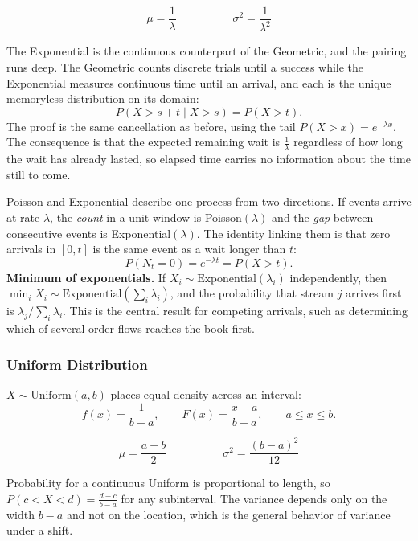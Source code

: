 \[
\mu = \frac{1}{\lambda} \hspace{5em} \sigma^2 = \frac{1}{\lambda^2}
\]

The Exponential is the continuous counterpart of the Geometric, and the pairing runs deep. The Geometric counts discrete trials until a success while the Exponential measures continuous time until an arrival, and each is the unique memoryless distribution on its domain:
\[
P(X > s + t \mid X > s) = P(X > t).
\]
The proof is the same cancellation as before, using the tail $P(X > x) = e^{-\lambda x}$. The consequence is that the expected remaining wait is $\frac{1}{\lambda}$ regardless of how long the wait has already lasted, so elapsed time carries no information about the time still to come.

\begin{keybox}
Poisson and Exponential describe one process from two directions. If events arrive at rate $\lambda$, the \textit{count} in a unit window is Poisson$(\lambda)$ and the \textit{gap} between consecutive events is Exponential$(\lambda)$. The identity linking them is that zero arrivals in $[0,t]$ is the same event as a wait longer than $t$:
\[
P(N_t = 0) = e^{-\lambda t} = P(X > t).
\]
\textbf{Minimum of exponentials.} If $X_i \sim \text{Exponential}(\lambda_i)$ independently, then $\min_i X_i \sim \text{Exponential}\!\left(\sum_i \lambda_i\right)$, and the probability that stream $j$ arrives first is $\lambda_j / \sum_i \lambda_i$. This is the central result for competing arrivals, such as determining which of several order flows reaches the book first.
\end{keybox}

\subsubsection{Uniform Distribution}

\begin{definition}
$X \sim \text{Uniform}(a,b)$ places equal density across an interval:
\[
f(x) = \frac{1}{b-a}, \qquad F(x) = \frac{x-a}{b-a}, \qquad a \leq x \leq b.
\]
\end{definition}

\[
\mu = \frac{a+b}{2} \hspace{5em} \sigma^2 = \frac{(b-a)^2}{12}
\]

Probability for a continuous Uniform is proportional to length, so $P(c < X < d) = \frac{d-c}{b-a}$ for any subinterval. The variance depends only on the width $b-a$ and not on the location, which is the general behavior of variance under a shift.

